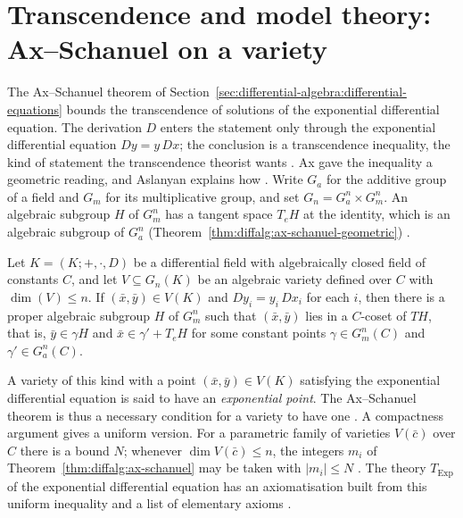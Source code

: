 \section{Transcendence and model theory: Ax--Schanuel on a variety}\label{sec:differential-algebra:transcendence}

The Ax--Schanuel theorem of Section~\ref{sec:differential-algebra:differential-equations}
bounds the transcendence of solutions of the exponential differential equation.
The derivation $D$ enters the statement only through the exponential
differential equation $Dy=y\,Dx$; the conclusion is a transcendence
inequality, the kind of statement the transcendence theorist wants
\cite[\S2]{Aslanyan2018}.
Ax \cite{Ax1971} gave the inequality a geometric reading, and Aslanyan
explains how \cite[\S2, p.~5]{Aslanyan2018}. Write $G_a$ for the additive
group of a field and $G_m$ for its multiplicative group, and set
$G_n=G_a^n\times G_m^n$. An algebraic subgroup $H$ of $G_m^n$ has a tangent
space $T_eH$ at the identity, which is an algebraic subgroup of $G_a^n$ (Theorem~\ref{thm:diffalg:ax-schanuel-geometric})
\cite[\S2, p.~6]{Aslanyan2018}.\begin{theorem}\label{thm:diffalg:ax-schanuel-geometric}
Let $K=(K;+,\cdot,D)$ be a differential field with algebraically closed
field of constants $C$, and let $V\subseteq G_n(K)$ be an algebraic variety
defined over $C$ with $\dim(V)\leq n$. If $(\bar{x},\bar{y})\in V(K)$ and
$Dy_i=y_i\,Dx_i$ for each $i$, then there is a proper algebraic subgroup $H$
of $G_m^n$ such that $(\bar{x},\bar{y})$ lies in a $C$-coset of $TH$, that
is, $\bar{y}\in\gamma H$ and $\bar{x}\in\gamma'+T_eH$ for some constant
points $\gamma\in G_m^n(C)$ and $\gamma'\in G_a^n(C)$.
\end{theorem}

A variety of this kind with a point $(\bar{x},\bar{y})\in V(K)$ satisfying
the exponential differential equation is said to have an \emph{exponential
point}. The Ax--Schanuel theorem is thus a necessary condition for a variety
to have one \cite[\S2, p.~6]{Aslanyan2018}. A compactness argument gives a
uniform version. For a parametric family of varieties $V(\bar{c})$ over $C$
there is a bound $N$; whenever $\dim V(\bar{c})\leq n$, the integers $m_i$
of Theorem~\ref{thm:diffalg:ax-schanuel} may be taken with $|m_i|\leq N$
\cite[\S2, p.~6]{Aslanyan2018}. The theory $T_{\mathrm{Exp}}$ of the
exponential differential equation has an axiomatisation built from this
uniform inequality and a list of elementary axioms
\cite[\S2, pp.~6--7]{Aslanyan2018}.

